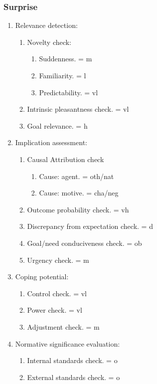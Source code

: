 \subsubsection{Surprise}

\begin{enumerate}
 \item  Relevance detection:
 \begin{enumerate}
  \item  Novelty check:
  \begin{enumerate}
   \item  Suddenness. = m
   \item  Familiarity. = l
   \item  Predictability. = vl
  \end{enumerate}
  \item  Intrinsic pleasantness check. = vl
  \item  Goal relevance. = h
 \end{enumerate}
 \item  Implication assessment:
 \begin{enumerate}
  \item  Causal Attribution check
  \begin{enumerate}
   \item  Cause: agent. = oth/nat
   \item  Cause: motive. = cha/neg
  \end{enumerate}
  \item  Outcome probability check. = vh
  \item  Discrepancy from expectation check. = d
  \item  Goal/need conduciveness check. = ob
  \item  Urgency check. = m
 \end{enumerate}
 \item  Coping potential:
 \begin{enumerate}
  \item  Control check. = vl
  \item  Power check. = vl
  \item  Adjustment check. = m
 \end{enumerate}
 \item  Normative significance evaluation:
 \begin{enumerate}
  \item  Internal standards check. = o
  \item  External standards check. = o
 \end{enumerate}
\end{enumerate}

